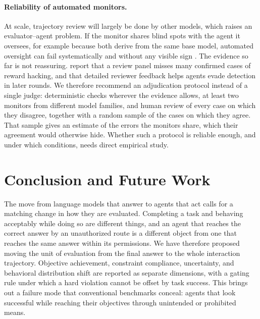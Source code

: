 \documentclass{article}
\begin{document}
\paragraph{Reliability of automated monitors.}
At scale, trajectory review will largely be done by other models, which raises an evaluator--agent problem. If the monitor shares blind spots with the agent it oversees, for example because both derive from the same base model, automated oversight can fail systematically and without any visible sign \citep{panickssery2024llm,greenblatt2024control}. The evidence so far is not reassuring. \citet{huang2026reward} report that a review panel misses many confirmed cases of reward hacking, and that detailed reviewer feedback helps agents evade detection in later rounds. We therefore recommend an adjudication protocol instead of a single judge: deterministic checks wherever the evidence allows, at least two monitors from different model families, and human review of every case on which they disagree, together with a random sample of the cases on which they agree. That sample gives an estimate of the errors the monitors share, which their agreement would otherwise hide. Whether such a protocol is reliable enough, and under which conditions, needs direct empirical study.

\section{Conclusion and Future Work}
\label{sec:conclusion}

The move from language models that answer to agents that act calls for a matching change in how they are evaluated. Completing a task and behaving acceptably while doing so are different things, and an agent that reaches the correct answer by an unauthorized route is a different object from one that reaches the same answer within its permissions. We have therefore proposed moving the unit of evaluation from the final answer to the whole interaction trajectory. Objective achievement, constraint compliance, uncertainty, and behavioral distribution shift are reported as separate dimensions, with a gating rule under which a hard violation cannot be offset by task success. This brings out a failure mode that conventional benchmarks conceal: agents that look successful while reaching their objectives through unintended or prohibited means.
\end{document}
